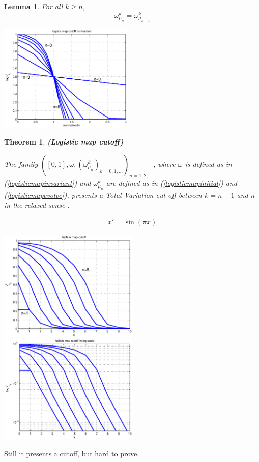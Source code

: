 \documentclass[dvips,landscape]{foils}
\renewcommand{\oursection}[1]{
\foilhead[-1.0cm]{#1}
}
\newtheorem{theorem}{Theorem}
\newtheorem{lemma}{Lemma}
\begin{document}
\begin{lemma}For all $k \ge n$,
$$\omega_{\mu_n}^k = \omega_{\mu_{n-1}}^{k}$$
\end{lemma}
\newpage
\centerline{
\includegraphics[width=0.48\textwidth,trim=0cm 0cm 0cm 0cm]{logisticmapcutoffnormalized.eps}
}
\begin{theorem} {\bfseries (Logistic map cutoff)}

The family $([0,1],\bar{\omega}, (\omega^k_{\mu_n})_{k=0,1,...})_{n=1,2,...}$, where $\bar{\omega}$ is defined as in (\ref{logisticmapinvariant}) and $\omega^k_{\mu_n}$ are defined as in (\ref{logisticmapinitial}) and (\ref{logisticmapevolve}), presents a Total Variation-cut-off between $k=n-1$ and $n$ in the relaxed sense .
\end{theorem}
\newpage
\oursection{Another Map}
 \begin{eqnarray}
    x' = \sin(\pi x)
 \end{eqnarray}
\centerline{
\includegraphics[width=0.50\textwidth,trim=1cm 1cm 0cm 0cm]{halfsinmapcutoff.eps}
\includegraphics[width=0.50\textwidth,trim=1cm 1cm 0cm 0cm]{halfsinmapcutofflog.eps}
}
Still it presents a cutoff, but hard to prove.
\end{document}

